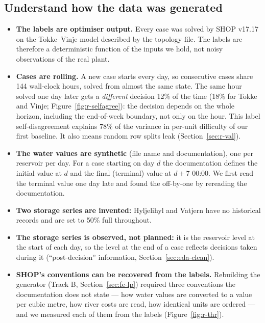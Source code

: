 \documentclass[11pt]{article}
\begin{document}
\subsection{Understand how the data was generated}
\label{sec:eda-generated}

\begin{itemize}
\item \textbf{The labels are optimiser output.} Every case was solved by SHOP v17.17 on the
  Tokke--Vinje model described by the topology file. The labels are therefore a deterministic
  function of the inputs we hold, not noisy observations of the real plant.
\item \textbf{Cases are rolling.} A new case starts every day, so consecutive cases share 144
  wall-clock hours, solved from almost the same state. The same hour solved one day later gets a
  \emph{different} decision 12\% of the time (18\% for Tokke and Vinje; Figure~\ref{fig:r-selfagree}):
  the decision depends on the whole horizon, including the end-of-week boundary, not only on the
  hour. This label self-disagreement explains 78\% of the variance in per-unit difficulty of our first
  baseline. It also means random row splits leak (Section~\ref{sec:r-val}).
\item \textbf{The water values are synthetic} (file name and documentation), one per reservoir per
  day. For a case starting on day $d$ the documentation defines the initial value at $d$ and the
  final (terminal) value at $d+7$ 00:00. We first read the terminal value one day late and found the
  off-by-one by rereading the documentation.
\item \textbf{Two storage series are invented:} Hyljelihyl and Vatjern have no historical records and
  are set to 50\% full throughout.
\item \textbf{The storage series is observed, not planned:} it is the reservoir level at the start of
  each day, so the level at the end of a case reflects decisions taken during it
  (``post-decision'' information, Section~\ref{sec:eda-clean}).
\item \textbf{SHOP's conventions can be recovered from the labels.} Rebuilding the generator
  (Track B, Section~\ref{sec:fe-lp}) required three conventions the documentation does not state ---
  how water values are converted to a value per cubic metre, how river costs are read, how identical
  units are ordered --- and we measured each of them from the labels (Figure~\ref{fig:r-thr}).
\end{itemize}
\end{document}
